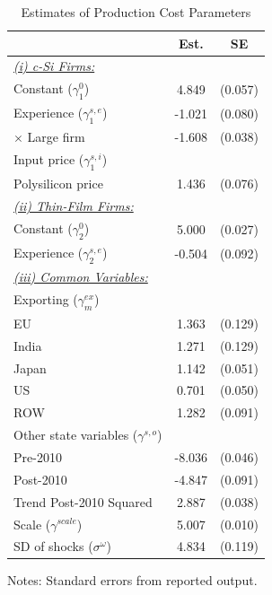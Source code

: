 \documentclass[12pt, letter]{article}
\begin{document}
\begin{table}[!h]
\centering
\caption{Estimates of Production Cost Parameters}
\label{tab:est_dyn_para_1}
\begin{threeparttable}
\begin{tabularx}{0.75\textwidth}{Xcc}
\toprule
 & Est. & SE \\
\midrule
\underline{\textit{(i) c-Si Firms:}} & \\
\quad Constant ($\gamma^{0}_{1}$) & 4.849 & (0.057) \\
\quad Experience ($\gamma^{s,e}_{1}$) & -1.021  & (0.080) \\
\qquad $\times$ Large firm & -1.608 & (0.038) \\
\quad Input price ($\gamma^{s,i}_{1}$) & \\
\qquad Polysilicon price & 1.436 & (0.076) \\
\underline{\textit{(ii) Thin-Film Firms:}} \\
\quad Constant ($\gamma^{0}_{2}$) & 5.000 & (0.027) \\
\quad Experience ($\gamma^{s,e}_{2}$) & -0.504  & (0.092) \\
\underline{\textit{(iii) Common Variables:}} &  \\
\quad Exporting ($\gamma_m^{ex}$) & \\
\qquad EU & 1.363 & (0.129) \\
\qquad India & 1.271 & (0.129) \\
\qquad Japan & 1.142 & (0.051) \\
\qquad US & 0.701 & (0.050) \\
\qquad ROW & 1.282 & (0.091) \\
\quad Other state variables ($\gamma^{s,o}$) &  \\
\qquad Pre-2010 & -8.036 & (0.046) \\
\qquad Post-2010 & -4.847 & (0.091) \\
\qquad Trend Post-2010 Squared & 2.887      & (0.038) \\
\quad Scale ($\gamma^{scale}$) & 5.007 & (0.010) \\
\quad SD of shocks ($\sigma^{\omega}$) & 4.834 & (0.119) \\
\bottomrule
\end{tabularx}
\begin{tablenotes}
  \item Notes: Standard errors from reported output.
\end{tablenotes}
\end{threeparttable}
\end{table}
\end{document}
